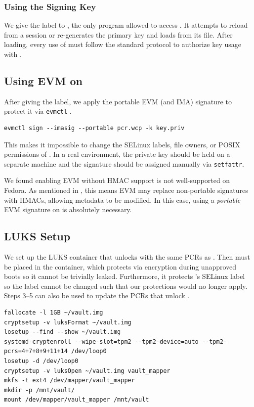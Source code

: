 \documentclass[12pt,letterpaper]{kuthesis}
\begin{document}
\subsubsection{Using the Signing Key}
We give the \exect label to \tpmsign, the only program allowed to access \wcp.
It attempts to reload \pk from a session or re-generates the primary key and loads \pk from its file.
After loading, every use of \pk must follow the standard protocol to authorize key usage with \wcp \cite{tpm2-software:2026:policyauthorize}.

\subsection{Using EVM on \wcp}\label{sec:implementation-evm}
After giving \wcp the \filet label,
we apply the portable EVM (and IMA) signature to protect it via \verb|evmctl| \cite{IBM:IMA-utilities-evmctl}.
\begin{lstlisting}[style=bash]
evmctl sign --imasig --portable pcr.wcp -k key.priv
\end{lstlisting}
This makes it impossible to change the SELinux labels, file owners, or POSIX permissions of \wcp.
In a real environment, the private key should be held on a separate machine
and the signature should be assigned manually via \verb|setfattr|.

We found enabling EVM without HMAC support is not well-supported on Fedora.
As mentioned in , this means EVM may replace non-portable signatures with HMACs, allowing metadata to be modified.
In this case, using a \emph{portable} EVM signature on \wcp is absolutely necessary.

\subsection{LUKS Setup}
We set up the \vault LUKS container that unlocks with the same PCRs as \wcp.
Then \wcp must be placed in the container, which protects \wcp via encryption during unapproved boots so it cannot be trivially leaked.
Furthermore, it protects \wcp's SELinux label so the label cannot be changed such that our protections would no longer apply.
Steps 3--5 can also be used to update the PCRs that unlock \vault.
\begin{lstlisting}[style=bash]
fallocate -l 1GB ~/vault.img
cryptsetup -v luksFormat ~/vault.img
losetup --find --show ~/vault.img
systemd-cryptenroll --wipe-slot=tpm2 --tpm2-device=auto --tpm2-pcrs=4+7+8+9+11+14 /dev/loop0
losetup -d /dev/loop0
cryptsetup -v luksOpen ~/vault.img vault_mapper
mkfs -t ext4 /dev/mapper/vault_mapper
mkdir -p /mnt/vault/
mount /dev/mapper/vault_mapper /mnt/vault
\end{lstlisting}
\end{document}
